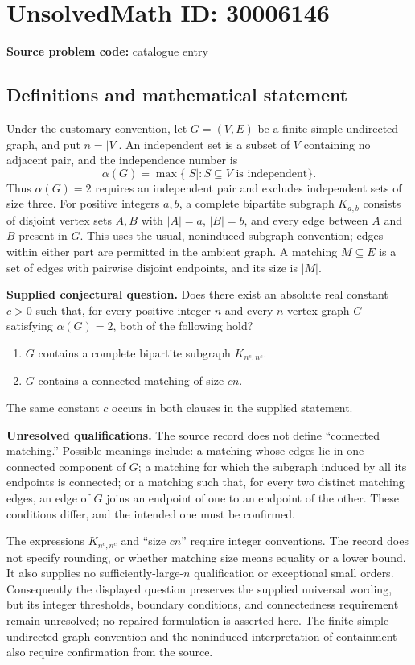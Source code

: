 \documentclass[11pt]{article}
\begin{document}
\section*{UnsolvedMath ID: 30006146}
\textbf{Source problem code:} catalogue entry
\subsection{Definitions and mathematical statement}
Under the customary convention, let \(G=(V,E)\) be a finite simple undirected graph, and put \(n=|V|\). An independent set is a subset of \(V\) containing no adjacent pair, and the independence number is
\[
\alpha(G)=\max\{|S|:S\subseteq V\text{ is independent}\}.
\]
Thus \(\alpha(G)=2\) requires an independent pair and excludes independent sets of size three. For positive integers \(a,b\), a complete bipartite subgraph \(K_{a,b}\) consists of disjoint vertex sets \(A,B\) with \(|A|=a\), \(|B|=b\), and every edge between \(A\) and \(B\) present in \(G\). This uses the usual, noninduced subgraph convention; edges within either part are permitted in the ambient graph. A matching \(M\subseteq E\) is a set of edges with pairwise disjoint endpoints, and its size is \(|M|\).

\textbf{Supplied conjectural question.} Does there exist an absolute real constant \(c>0\) such that, for every positive integer \(n\) and every \(n\)-vertex graph \(G\) satisfying \(\alpha(G)=2\), both of the following hold?
\begin{enumerate}
\item \(G\) contains a complete bipartite subgraph \(K_{n^c,n^c}\).
\item \(G\) contains a connected matching of size \(cn\).
\end{enumerate}
The same constant \(c\) occurs in both clauses in the supplied statement.

\textbf{Unresolved qualifications.} The source record does not define ``connected matching.'' Possible meanings include: a matching whose edges lie in one connected component of \(G\); a matching for which the subgraph induced by all its endpoints is connected; or a matching such that, for every two distinct matching edges, an edge of \(G\) joins an endpoint of one to an endpoint of the other. These conditions differ, and the intended one must be confirmed.

The expressions \(K_{n^c,n^c}\) and ``size \(cn\)'' require integer conventions. The record does not specify rounding, or whether matching size means equality or a lower bound. It also supplies no sufficiently-large-\(n\) qualification or exceptional small orders. Consequently the displayed question preserves the supplied universal wording, but its integer thresholds, boundary conditions, and connectedness requirement remain unresolved; no repaired formulation is asserted here. The finite simple undirected graph convention and the noninduced interpretation of containment also require confirmation from the source.
\end{document}
